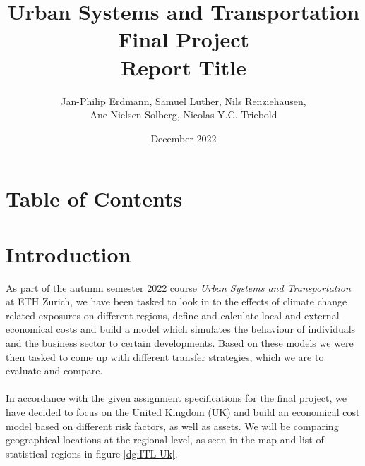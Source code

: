 \documentclass[10pt,a4]{article}
\title{\vspace{.0cm}Urban Systems and Transportation \\ Final Project \vspace{5cm}\\ \textbf{Report Title}\vspace{3.5cm}}
\author{Jan-Philip Erdmann, Samuel Luther, Nils Renziehausen, \\Ane Nielsen Solberg, Nicolas Y.C. Triebold\vspace{1cm}}
\date{December 2022}
\begin{document}
\maketitle
\newpage
{}

\section{Table of Contents}

\newpage

\section{Introduction}
As part of the autumn semester 2022 course \textit{Urban Systems and Transportation}\cite{course} at ETH Zurich, we have been tasked to look in to the effects of climate change related exposures on different regions, define and calculate local and external economical costs and build a model which simulates the behaviour of individuals and the business sector to certain developments. Based on these models we were then tasked to come up with different transfer strategies, which we are to evaluate and compare.\\\\
In accordance with the given assignment specifications for the final project, we have decided to focus on the United Kingdom (UK) and build an economical cost model based on different risk factors, as well as assets. We will be comparing geographical locations at the regional level, as seen in the map and list of statistical regions in figure \ref{dg:ITL Uk}.\\
\end{document}
